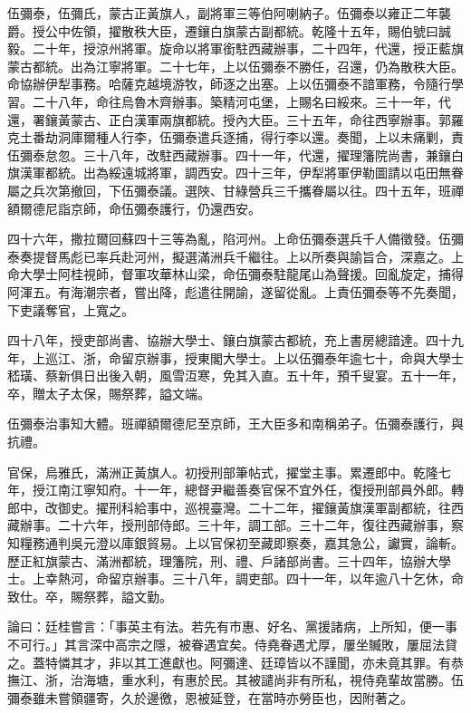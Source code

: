 \begin{pinyinscope}
伍彌泰，伍彌氏，蒙古正黃旗人，副將軍三等伯阿喇納子。伍彌泰以雍正二年襲爵。授公中佐領，擢散秩大臣，遷鑲白旗蒙古副都統。乾隆十五年，賜伯號曰誠毅。二十年，授涼州將軍。旋命以將軍銜駐西藏辦事，二十四年，代還，授正藍旗蒙古都統。出為江寧將軍。二十七年，上以伍彌泰不勝任，召還，仍為散秩大臣。命協辦伊犁事務。哈薩克越境游牧，師逐之出塞。上以伍彌泰不諳軍務，令隨行學習。二十八年，命往烏魯木齊辦事。築精河屯堡，上賜名曰綏來。三十一年，代還，署鑲黃蒙古、正白漢軍兩旗都統。授內大臣。三十五年，命往西寧辦事。郭羅克土番劫洞庫爾種人行李，伍彌泰遣兵逐捕，得行李以還。奏聞，上以未痛剿，責伍彌泰怠忽。三十八年，改駐西藏辦事。四十一年，代還，擢理籓院尚書，兼鑲白旗漢軍都統。出為綏遠城將軍，調西安。四十三年，伊犁將軍伊勒圖請以屯田無眷屬之兵次第撤回，下伍彌泰議。選陜、甘綠營兵三千攜眷屬以往。四十五年，班禪額爾德尼詣京師，命伍彌泰護行，仍還西安。

四十六年，撒拉爾回蘇四十三等為亂，陷河州。上命伍彌泰選兵千人備徵發。伍彌泰奏提督馬彪已率兵赴河州，擬選滿洲兵千繼往。上以所奏與諭旨合，深嘉之。上命大學士阿桂視師，督軍攻華林山梁，命伍彌泰駐龍尾山為聲援。回亂旋定，捕得阿渾五。有海潮宗者，嘗出降，彪遣往開諭，遂留從亂。上責伍彌泰等不先奏聞，下吏議奪官，上寬之。

四十八年，授吏部尚書、協辦大學士、鑲白旗蒙古都統，充上書房總諳達。四十九年，上巡江、浙，命留京辦事，授東閣大學士。上以伍彌泰年逾七十，命與大學士嵇璜、蔡新俱日出後入朝，風雪沍寒，免其入直。五十年，預千叟宴。五十一年，卒，贈太子太保，賜祭葬，謚文端。

伍彌泰治事知大體。班禪額爾德尼至京師，王大臣多和南稱弟子。伍彌泰護行，與抗禮。

官保，烏雅氏，滿洲正黃旗人。初授刑部筆帖式，擢堂主事。累遷郎中。乾隆七年，授江南江寧知府。十一年，總督尹繼善奏官保不宜外任，復授刑部員外郎。轉郎中，改御史。擢刑科給事中，巡視臺灣。二十二年，擢鑲黃旗漢軍副都統，往西藏辦事。二十六年，授刑部侍郎。三十年，調工部。三十二年，復往西藏辦事，察知糧務通判吳元澄以庫銀貿易。上以官保初至藏即察奏，嘉其急公，讞實，論斬。歷正紅旗蒙古、滿洲都統，理籓院，刑、禮、戶諸部尚書。三十四年，協辦大學士。上幸熱河，命留京辦事。三十八年，調吏部。四十一年，以年逾八十乞休，命致仕。卒，賜祭葬，謚文勤。

論曰：廷桂嘗言：「事英主有法。若先有市惠、好名、黨援諸病，上所知，便一事不可行。」其言深中高宗之隱，被眷遇宜矣。侍堯眷遇尤厚，屢坐贓敗，屢屈法貸之。蓋特憐其才，非以其工進獻也。阿彌達、廷璋皆以不謹聞，亦未竟其罪。有恭撫江、浙，治海塘，重水利，有惠於民。其被譴尚非有所私，視侍堯輩故當勝。伍彌泰雖未嘗領疆寄，久於邊徼，恩被延登，在當時亦勞臣也，因附著之。


\end{pinyinscope}